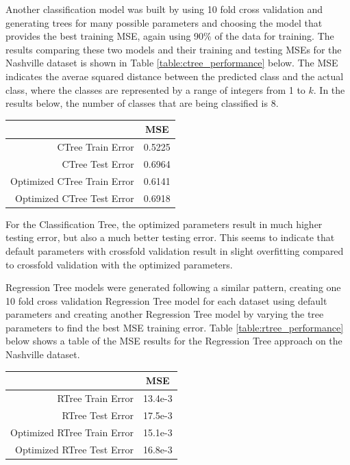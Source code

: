 \documentclass[10pt]{article}
\begin{document}
\begin{multicols}{2}
		Another classification model was built by using 10 fold cross validation and generating trees for many possible parameters and choosing the model that provides the best training MSE, again using 90\% of the data for training. The results comparing these two models and their training and testing MSEs for the Nashville dataset is shown in Table \ref{table:ctree_performance} below. The MSE indicates the averae squared distance between the predicted class and the actual class, where the classes are represented by a range of integers from 1 to \(k\). In the results below, the number of classes that are being classified is 8.

		\begin{center}
		\captionsetup{type=table}
			\begin{tabular}{r|c}
				& \small{MSE} \\
				\hline
				\small{CTree Train Error} & \small{0.5225} \\
				\hline
				\small{CTree Test Error} & \small{0.6964} \\
				\hline
				\small{Optimized CTree Train Error} & \small{0.6141} \\
				\hline
				\small{Optimized CTree Test Error} & \small{0.6918} \\
				\hline
			\end{tabular}
			\label{table:ctree_performance}        
		\end{center}

		For the Classification Tree, the optimized parameters result in much higher testing error, but also a much better testing error. This seems to indicate that default parameters with crossfold validation result in slight overfitting compared to crossfold validation with the optimized parameters.

		Regression Tree models were generated following a similar pattern, creating one 10 fold cross validation Regression Tree model for each dataset using default parameters and creating another Regression Tree model by varying the tree parameters to find the best MSE training error. Table \ref{table:rtree_performance} below shows a table of the MSE results for the Regression Tree approach on the Nashville dataset. 

		\begin{center}
		\captionsetup{type=table}
			\begin{tabular}{r|c}
				& \small{MSE} \\
				\hline
				\small{RTree Train Error} & \small{13.4e-3} \\
				\hline
				\small{RTree Test Error} & \small{17.5e-3} \\
				\hline
				\small{Optimized RTree Train Error} & \small{15.1e-3} \\
				\hline
				\small{Optimized RTree Test Error} & \small{16.8e-3} \\
				\hline
			\end{tabular}
			\label{table:rtree_performance}        
		\end{center}
	

\end{multicols}
\end{document}
